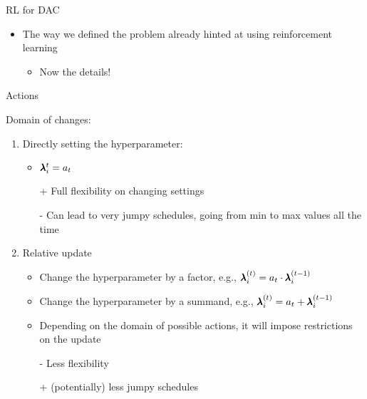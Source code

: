 	
\begin{frame}[c]{RL for DAC}
	
	\centering
    
    \bigskip
	
	\begin{itemize}
	    \item The way we defined the problem already hinted at using reinforcement learning
	    \begin{itemize}
	        \item Now the details!
	    \end{itemize}
	\end{itemize}	
	
\end{frame}
\begin{frame}[c]{Actions}
	
	Domain of changes:
	\begin{enumerate}
	    \item Directly setting the hyperparameter:
	    \begin{itemize}
	        \item $\pmb{\lambda}^t_i = a_t$
	        \item[+] Full flexibility on changing settings
	        \item[-] Can lead to very jumpy schedules, going from min to max values all the time
	    \end{itemize}
	    \item Relative update
	    \begin{itemize}
	        \item Change the hyperparameter by a factor, e.g., $\pmb{\lambda}^{(t)}_i = a_t \cdot \pmb{\lambda}^{(t-1)}_i$
	        \item Change the hyperparameter by a summand, e.g., $\pmb{\lambda}^{(t)}_i = a_t + \pmb{\lambda}^{(t-1)}_i$
	        \item Depending on the domain of possible actions, it will impose restrictions on the update
	        \item[-] Less flexibility
	        \item[+] (potentially) less jumpy schedules
	    \end{itemize}
	\end{enumerate}
	
\end{frame}

